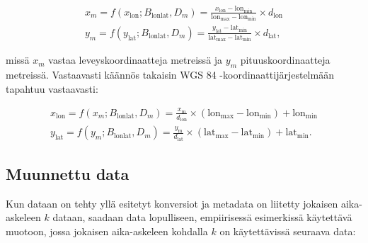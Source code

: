 \documentclass[
  12pt,
  a4paper, twoside]{book}
\begin{document}
\begin{align}\label{wgs84-m}
x_m = f(x_{\text{lon}}; B_{\text{lonlat}}, D_m) = \frac{x_{\text{lon}} -\text{lon}_{\text{min}}}{\text{lon}_{\text{max}}-\text{lon}_{\text{min}}} \times d_{\text{lon}}   \\
y_m = f(y_{\text{lat}}; B_{\text{lonlat}}, D_m) = \frac{y_{\text{lat}} -\text{lat}_{\text{min}}}{\text{lat}_{\text{max}}-\text{lat}_{\text{min}}} \times d_{\text{lat}}
,\end{align}

missä \(x_m\) vastaa leveyskoordinaatteja metreissä ja \(y_m\) pituuskoordinaatteja metreissä. Vastaavasti käännös takaisin WGS 84 -koordinaattijärjestelmään tapahtuu vastaavasti:

\begin{align}\label{m-wgs84}
x_{\text{lon}} = f(x_m; B_{\text{lonlat}}, D_m) = \frac{x_{\text{m}}}{d_{\text{lon}}} \times (\text{lon}_{\text{max}}-\text{lon}_{\text{min}}) + \text{lon}_{\text{min}} \\
y_{\text{lat}} = f(y_m; B_{\text{lonlat}}, D_m) = \frac{y_{\text{m}}}{d_{\text{lat}}} \times (\text{lat}_{\text{max}}-\text{lat}_{\text{min}}) + \text{lat}_{\text{min}}
.\end{align}

\subsection{Muunnettu data} \label{muunnettu-data-luku}

Kun dataan on tehty yllä esitetyt konversiot ja metadata on liitetty jokaisen aika-askeleen \(k\) dataan, saadaan data lopulliseen, empiirisessä esimerkissä käytettävä muotoon, jossa jokaisen aika-askeleen kohdalla \(k\) on käytettävissä seuraava data:
\end{document}
